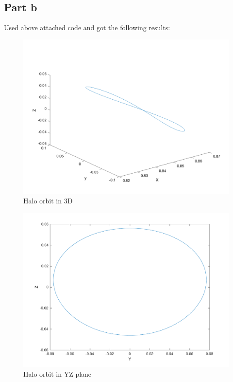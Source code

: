  \subsection{Part b}
 Used above attached code and got the following results:
 \begin{figure}[H]
    \centering
    \includegraphics[width=\textwidth]{../Figure/Q2/fig1}
    \caption{Halo orbit in 3D}
\end{figure}

\begin{figure}[H]
    \centering
    \includegraphics[width=\textwidth]{../Figure/Q2/fig2}
    \caption{Halo orbit in YZ plane}
\end{figure}

